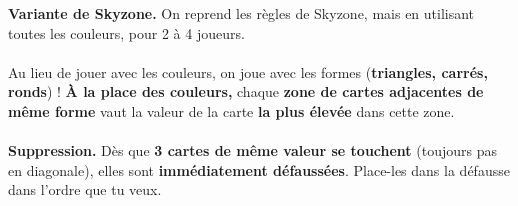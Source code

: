 \documentclass[a4paper]{memoir}
\begin{document}
{\footnotesize

\noindent
\textbf{ Variante de Skyzone.} 
On reprend les règles de Skyzone, mais en utilisant toutes les couleurs, pour 2 à 4 joueurs.
\\
\\
\noindent
{} Au lieu de jouer avec les couleurs, on joue avec les formes (\textbf{triangles, carrés, ronds}) !  
\textbf{À la place des couleurs,} chaque \textbf{zone de cartes adjacentes de même forme} vaut la valeur de la carte \textbf{la plus élevée} dans cette zone.
\\
\\
\noindent
\textbf{ Suppression.} 
Dès que \textbf{3 cartes de même valeur se touchent} (toujours pas en diagonale), elles sont \textbf{immédiatement défaussées}. 
Place-les dans la défausse dans l'ordre que tu veux.
}
\end{document}
